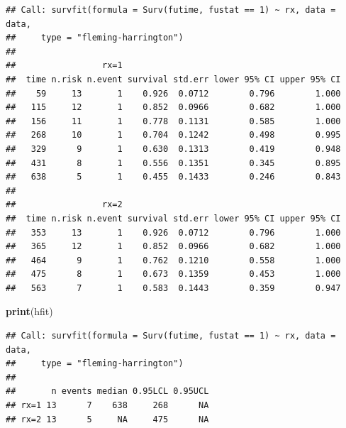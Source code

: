 \documentclass[
]{article}
\newenvironment{Shaded}{\begin{snugshade}}{\end{snugshade}}
\newcommand{\FunctionTok}[1]{\textcolor[rgb]{0.13,0.29,0.53}{\textbf{#1}}}
\newcommand{\NormalTok}[1]{#1}
\begin{document}
\begin{verbatim}
## Call: survfit(formula = Surv(futime, fustat == 1) ~ rx, data = data, 
##     type = "fleming-harrington")
## 
##                 rx=1 
##  time n.risk n.event survival std.err lower 95% CI upper 95% CI
##    59     13       1    0.926  0.0712        0.796        1.000
##   115     12       1    0.852  0.0966        0.682        1.000
##   156     11       1    0.778  0.1131        0.585        1.000
##   268     10       1    0.704  0.1242        0.498        0.995
##   329      9       1    0.630  0.1313        0.419        0.948
##   431      8       1    0.556  0.1351        0.345        0.895
##   638      5       1    0.455  0.1433        0.246        0.843
## 
##                 rx=2 
##  time n.risk n.event survival std.err lower 95% CI upper 95% CI
##   353     13       1    0.926  0.0712        0.796        1.000
##   365     12       1    0.852  0.0966        0.682        1.000
##   464      9       1    0.762  0.1210        0.558        1.000
##   475      8       1    0.673  0.1359        0.453        1.000
##   563      7       1    0.583  0.1443        0.359        0.947
\end{verbatim}

\begin{Shaded}
\begin{Highlighting}[]
\FunctionTok{print}\NormalTok{(hfit)}
\end{Highlighting}
\end{Shaded}

\begin{verbatim}
## Call: survfit(formula = Surv(futime, fustat == 1) ~ rx, data = data, 
##     type = "fleming-harrington")
## 
##       n events median 0.95LCL 0.95UCL
## rx=1 13      7    638     268      NA
## rx=2 13      5     NA     475      NA
\end{verbatim}
\end{document}
